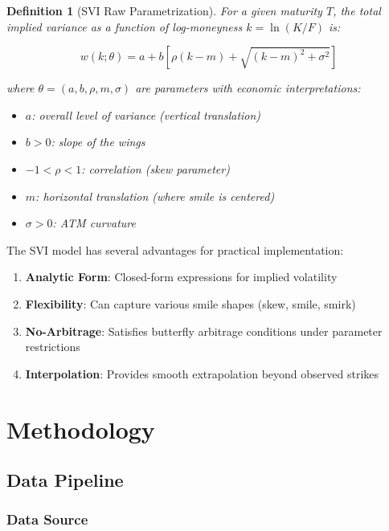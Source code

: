\documentclass[12pt,a4paper]{article}
\newtheorem{definition}{Definition}
\begin{document}
\begin{definition}[SVI Raw Parametrization]
For a given maturity $T$, the total implied variance as a function of log-moneyness $k = \ln(K/F)$ is:

\begin{equation}\label{eq:svi}
    w(k; \theta) = a + b\left[\rho(k-m) + \sqrt{(k-m)^2 + \sigma^2}\right]
\end{equation}

where $\theta = (a, b, \rho, m, \sigma)$ are parameters with economic interpretations:
\begin{itemize}
    \item $a$: overall level of variance (vertical translation)
    \item $b > 0$: slope of the wings
    \item $-1 < \rho < 1$: correlation (skew parameter)
    \item $m$: horizontal translation (where smile is centered)
    \item $\sigma > 0$: ATM curvature
\end{itemize}
\end{definition}

The SVI model has several advantages for practical implementation:

\begin{enumerate}
    \item \textbf{Analytic Form}: Closed-form expressions for implied volatility
    \item \textbf{Flexibility}: Can capture various smile shapes (skew, smile, smirk)
    \item \textbf{No-Arbitrage}: Satisfies butterfly arbitrage conditions under parameter restrictions
    \item \textbf{Interpolation}: Provides smooth extrapolation beyond observed strikes
\end{enumerate}

\section{Methodology}\label{sec:methodology}

\subsection{Data Pipeline}

\subsubsection{Data Source}
\end{document}
